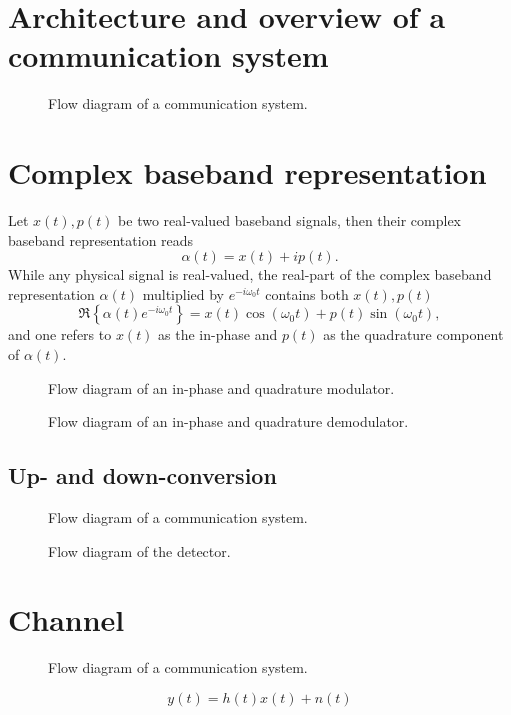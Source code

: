 \section{Architecture and overview of a communication system}

\begin{figure}[h]
	\centering
	
	\caption{Flow diagram of a communication system.}
\end{figure}

\section{Complex baseband representation}

Let $x(t),p(t)$ be two real-valued baseband signals, then their complex baseband representation reads
\begin{equation}
	\alpha(t)
	=
	x(t)
	+
	ip(t)
	.
\end{equation}
While any physical signal is real-valued, the real-part of the complex baseband representation $\alpha(t)$ multiplied by $e^{-i\omega_0t}$ contains both $x(t),p(t)$~\cite[p.~25]{Madhow2008}
\begin{equation}
	\Re\left\{
		\alpha(t)
		e^{-i\omega_0t}
	\right\}
	=
	x(t)
	\cos(\omega_0t)
	+
	p(t)
	\sin(\omega_0t)
	,
\end{equation}
and one refers to $x(t)$ as the in-phase and $p(t)$ as the quadrature component of $\alpha(t)$.
\begin{figure}[h]
	\centering
	
	\caption{Flow diagram of an in-phase and quadrature modulator.}
\end{figure}
\begin{figure}[h]
	\centering
	
	\caption{Flow diagram of an in-phase and quadrature demodulator.}
\end{figure}

\subsection{Up- and down-conversion}

\begin{figure}[h]
	\centering
	
	\caption{Flow diagram of a communication system.}
\end{figure}

\begin{figure}[h]
	\centering
	
	\caption{Flow diagram of the detector.}
\end{figure}

\section{Channel}

\begin{figure}[h]
	\centering
	
	\caption{Flow diagram of a communication system.}
\end{figure}
\begin{equation}
	y(t)
	=
	h(t)x(t)
	+
	n(t)
\end{equation}